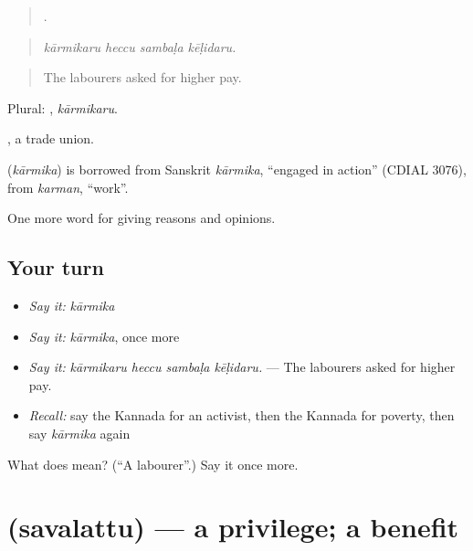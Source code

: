 \begin{quote}
   .
\end{quote}

\begin{quote}
\emph{kārmikaru heccu sambaḷa kēḷidaru.}
\end{quote}

\begin{quote}
The labourers asked for higher pay.
\end{quote}

Plural: , \emph{kārmikaru}.

 , a trade union.

\begin{cousinweb}
\textbf{} (\emph{kārmika}) is borrowed from Sanskrit \emph{kārmika}, \textquotedblleft{}engaged in action\textquotedblright{} (CDIAL 3076), from \emph{karman}, \textquotedblleft{}work\textquotedblright{}.
\end{cousinweb}

\begin{grammarlens}[title={What you've built}]
One more word for giving reasons and opinions.
\end{grammarlens}

\subsection*{Your turn}
\begin{itemize}
\raggedright
  \item \emph{Say it:} \emph{kārmika}
  \item \emph{Say it:} \emph{kārmika}, once more
  \item \emph{Say it:} \emph{kārmikaru heccu sambaḷa kēḷidaru.} — The labourers asked for higher pay.
  \item \emph{Recall:} say the Kannada for an activist, then the Kannada for poverty, then say \emph{kārmika} again
\end{itemize}

\begin{tcolorbox}[breakable,colback=teal!4,colframe=teal!35!black,title={Before you move on}]
What does  mean? (\textquotedblleft{}A labourer\textquotedblright{}.) Say it once more.
\end{tcolorbox}
\section[\texorpdfstring{\kn{ಸವಲತ್ತು} (savalattu)}{ಸವಲತ್ತು (savalattu)}]{ (savalattu) — a privilege; a benefit}

